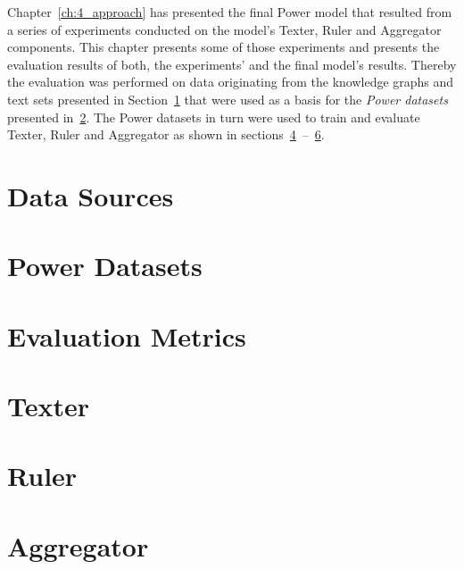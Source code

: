 Chapter~\ref{ch:4_approach} has presented the final Power model that resulted from a series of experiments conducted on the model's Texter, Ruler and Aggregator components. This chapter presents some of those experiments and presents the evaluation results of both, the experiments' and the final model's results. Thereby the evaluation was performed on data originating from the knowledge graphs and text sets presented in Section~\ref{sec:5_experiments/1_data_sources} that were used as a basis for the \emph{Power datasets} presented in~\ref{sec:5_experiments/2_power_datasets}. The Power datasets in turn were used to train and evaluate Texter, Ruler and Aggregator as shown in sections~\ref{sec:5_experiments/4_texter}~--~\ref{sec:5_experiments/6_aggregator}.


\section{Data Sources}
\label{sec:5_experiments/1_data_sources}



\section{Power Datasets}
\label{sec:5_experiments/2_power_datasets}



\section{Evaluation Metrics}
\label{sec:5_experiments/3_metrics}



\section{Texter}
\label{sec:5_experiments/4_texter}



\section{Ruler}
\label{sec:5_experiments/5_ruler}



\section{Aggregator}
\label{sec:5_experiments/6_aggregator}

